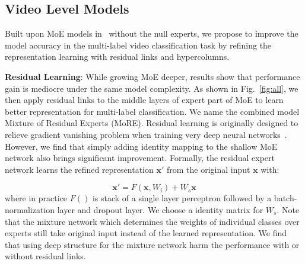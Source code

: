\documentclass[10pt,twocolumn,letterpaper]{article}
\begin{document}



\subsection{Video Level Models} 
Built upon MoE models in~\cite{yt8m} without the null experts, we propose to improve the model accuracy in the multi-label video classification task by refining the representation learning with residual links and hypercolumns.

\textbf{Residual Learning}:
While growing MoE deeper, results show that performance gain is mediocre under the same model complexity. As shown in Fig.~\ref{fig:all}, we then apply residual links to the middle layers of expert part of MoE to learn better representation for multi-label classification. We name the combined model Mixture of Residual Experts (MoRE). Residual learning is originally designed to relieve gradient vanishing problem when training very deep neural networks~\cite{he2016deep}. However, we find that simply adding identity mapping to the shallow MoE network also brings significant improvement. Formally, the residual expert network learns the refined representation $\mathbf{x}'$ from the original input $\mathbf{x}$ with:

\begin{equation}
    \mathbf{x}'=F(\mathbf{x},{W_i})+W_s\mathbf{x}
\end{equation}
where in practice $F()$ is stack of a single layer perceptron followed by a batch-normalization layer and dropout layer. We choose a identity matrix for $W_s$. Note that the mixture network which determines the weights of individual classes over experts still take original input instead of the learned representation. We find that using deep structure for the mixture network harm the performance with or without residual links.
\end{document}
